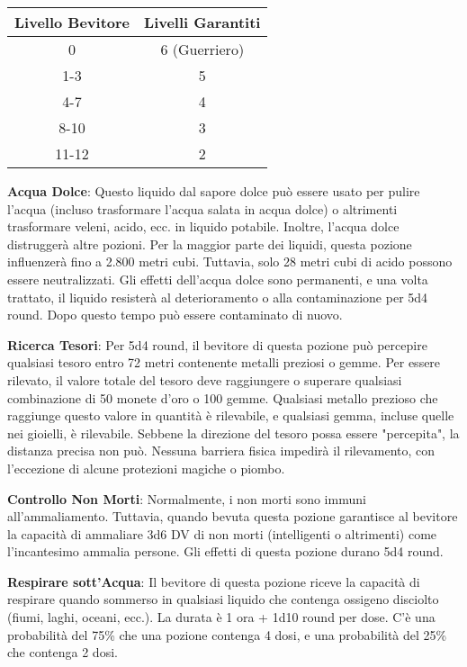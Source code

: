 \documentclass{article}
\begin{document}
\begin{multicols}{2}
\begin{table}[h]
\centering
\begin{tabular}{|c|c|}
\hline
\textbf{Livello Bevitore} & \textbf{Livelli Garantiti} \\
\hline
0 & 6 (Guerriero) \\
1-3 & 5 \\
4-7 & 4 \\
8-10 & 3 \\
11-12 & 2 \\
\hline
\end{tabular}

\end{table}

\textbf{Acqua Dolce}: Questo liquido dal sapore dolce può essere usato per pulire l'acqua (incluso trasformare l'acqua salata in acqua dolce) o altrimenti trasformare veleni, acido, ecc. in liquido potabile. Inoltre, l'acqua dolce distruggerà altre pozioni. Per la maggior parte dei liquidi, questa pozione influenzerà fino a 2.800 metri cubi. Tuttavia, solo 28 metri cubi di acido possono essere neutralizzati. Gli effetti dell'acqua dolce sono permanenti, e una volta trattato, il liquido resisterà al deterioramento o alla contaminazione per 5d4 round. Dopo questo tempo può essere contaminato di nuovo.

\textbf{Ricerca Tesori}: Per 5d4 round, il bevitore di questa pozione può percepire qualsiasi tesoro entro 72 metri contenente metalli preziosi o gemme. Per essere rilevato, il valore totale del tesoro deve raggiungere o superare qualsiasi combinazione di 50 monete d'oro o 100 gemme. Qualsiasi metallo prezioso che raggiunge questo valore in quantità è rilevabile, e qualsiasi gemma, incluse quelle nei gioielli, è rilevabile. Sebbene la direzione del tesoro possa essere "percepita", la distanza precisa non può. Nessuna barriera fisica impedirà il rilevamento, con l'eccezione di alcune protezioni magiche o piombo.

\textbf{Controllo Non Morti}: Normalmente, i non morti sono immuni all'ammaliamento. Tuttavia, quando bevuta questa pozione garantisce al bevitore la capacità di ammaliare 3d6 DV di non morti (intelligenti o altrimenti) come l'incantesimo ammalia persone. Gli effetti di questa pozione durano 5d4 round.

\textbf{Respirare sott'Acqua}: Il bevitore di questa pozione riceve la capacità di respirare quando sommerso in qualsiasi liquido che contenga ossigeno disciolto (fiumi, laghi, oceani, ecc.). La durata è 1 ora + 1d10 round per dose. C'è una probabilità del 75\% che una pozione contenga 4 dosi, e una probabilità del 25\% che contenga 2 dosi.


\end{multicols}
\end{document}
